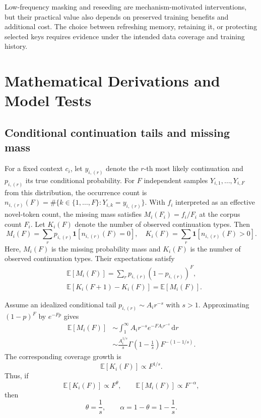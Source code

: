 Low-frequency masking and reseeding are mechanism-motivated interventions, but their practical value also depends on preserved training benefits and additional cost. The choice between refreshing memory, retaining it, or protecting selected keys requires evidence under the intended data coverage and training history.

\section{Mathematical Derivations and Model Tests}
\label{app:math}

\subsection{Conditional continuation tails and missing mass}
For a fixed context $c_i$, let $y_{i,(r)}$ denote the $r$-th most likely continuation and $p_{i,(r)}$ its true conditional probability. For $F$ independent samples $Y_{i,1},\ldots,Y_{i,F}$ from this distribution, the occurrence count is $n_{i,(r)}(F)=\#\{k\in\{1,\ldots,F\}:Y_{i,k}=y_{i,(r)}\}$. With $f_i$ interpreted as an effective novel-token count, the missing mass satisfies $M_i(F_i)=f_i/F_i$ at the corpus count $F_i$. Let $K_i(F)$ denote the number of observed continuation types. Then
\begin{equation}
M_i(F)=\sum_r p_{i,(r)}
\mathbf{1}\left[n_{i,(r)}(F)=0\right],
\quad
K_i(F)=\sum_r
\mathbf{1}\left[n_{i,(r)}(F)>0\right].
\end{equation}
Here, $M_i(F)$ is the missing probability mass and $K_i(F)$ is the number of observed continuation types. Their expectations satisfy
\begin{equation}
\begin{aligned}
&\mathbb{E}[M_i(F)]
=\sum_r p_{i,(r)}(1-p_{i,(r)})^F,\\
&\mathbb{E}[K_i(F+1)-K_i(F)]
=\mathbb{E}[M_i(F)].
\end{aligned}
\end{equation}

Assume an idealized conditional tail
$p_{i,(r)}\sim A_i r^{-s}$ with $s>1$. Approximating
$(1-p)^F$ by $e^{-Fp}$ gives
\begin{equation}
\begin{aligned}
\mathbb{E}[M_i(F)]
&\sim
\int_1^\infty A_i r^{-s}e^{-F A_i r^{-s}}\,\mathrm{d}r\\
&\sim
\frac{A_i^{1/s}}{s}
\Gamma\!\left(1-\frac1s\right)
F^{-(1-1/s)}.
\end{aligned}
\label{eq:occupancy}
\end{equation}
The corresponding coverage growth is
\begin{equation}
\mathbb{E}[K_i(F)]\propto F^{1/s}.
\end{equation}
Thus, if
\begin{equation}
\mathbb{E}[K_i(F)]\propto F^\theta,
\qquad
\mathbb{E}[M_i(F)]\propto F^{-\alpha},
\end{equation}
then
\begin{equation}
\theta=\frac{1}{s},
\qquad
\alpha=1-\theta=1-\frac{1}{s}.
\end{equation}

